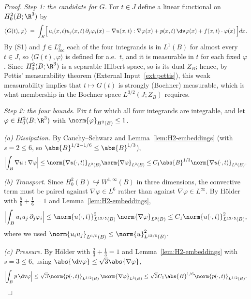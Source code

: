 \documentclass[11pt,reqno]{amsart}
\begin{document}
\begin{proof}
\emph{Step 1: the candidate for $G$.} For $t\in J$ define a linear functional on
$H^{2}_{0}(B;\R^{3})$ by
\begin{equation}\label{eq:G-def}
  \bigl\langle G(t),\varphi\bigr\rangle
  \;=\;\int_{B}\Bigl[\,u_{i}(x,t)u_{j}(x,t)\,\partial_{j}\varphi_{i}(x)
      -\nabla u(x,t):\nabla\varphi(x)
      +p(x,t)\,\dv\varphi(x)
      +f(x,t)\cdot\varphi(x)\,\Bigr]dx .
\end{equation}
By (S1) and $f\in L^{q}_{loc}$ each of the four integrands is in $L^{1}(B)$ for
almost every $t\in J$, so $\langle G(t),\varphi\rangle$ is defined for a.e.\
$t$, and it is measurable in $t$ for each fixed $\varphi$. Since
$H^{2}_{0}(B;\R^{3})$ is a separable Hilbert space, so is its dual $Z_{B}$;
hence, by Pettis' measurability theorem
(External Input~\ref{ext:pettis}), this weak measurability implies that
$t\mapsto G(t)$ is strongly (Bochner) measurable, which is what membership in
the Bochner space $L^{3/2}(J;Z_{B})$ requires.

\emph{Step 2: the four bounds.} Fix $t$ for which all four integrands are
integrable, and let $\varphi\in H^{2}_{0}(B;\R^{3})$ with
$\norm{\varphi}_{H^{2}(B)}\le1$.

\emph{(a) Dissipation.} By Cauchy--Schwarz and
Lemma~\ref{lem:H2-embeddings} (with $s=2\le6$, so
$\abs{B}^{1/2-1/6}\le\abs{B}^{1/3}$),
\[
  \Bigl|\int_{B}\nabla u:\nabla\varphi\Bigr|
  \le\norm{\nabla u(\cdot,t)}_{L^{2}(B)}\norm{\nabla\varphi}_{L^{2}(B)}
  \le C_{1}\abs{B}^{1/3}\norm{\nabla u(\cdot,t)}_{L^{2}(B)} .
\]

\emph{(b) Transport.} Since $H^{2}_{0}(B)\not\hookrightarrow W^{1,\infty}(B)$ in
three dimensions, the convective term must be paired against
$\nabla\varphi\in L^{6}$ rather than against $\nabla\varphi\in L^{\infty}$. By
H\"older with $\tfrac{5}{6}+\tfrac16=1$ and Lemma~\ref{lem:H2-embeddings},
\[
  \Bigl|\int_{B}u_{i}u_{j}\,\partial_{j}\varphi_{i}\Bigr|
  \le\norm{u(\cdot,t)}_{L^{12/5}(B)}^{2}\,
     \norm{\nabla\varphi}_{L^{6}(B)}
  \le C_{1}\norm{u(\cdot,t)}_{L^{12/5}(B)}^{2} ,
\]
where we used $\norm{u_{i}u_{j}}_{L^{6/5}(B)}\le\norm{u}_{L^{12/5}(B)}^{2}$.

\emph{(c) Pressure.} By H\"older with $\tfrac{2}{3}+\tfrac13=1$ and
Lemma~\ref{lem:H2-embeddings} with $s=3\le6$, using
$\abs{\dv\varphi}\le\sqrt{3}\abs{\nabla\varphi}$,
\[
  \Bigl|\int_{B}p\,\dv\varphi\Bigr|
  \le\sqrt{3}\norm{p(\cdot,t)}_{L^{3/2}(B)}\,\norm{\nabla\varphi}_{L^{3}(B)}
  \le\sqrt{3}C_{1}\abs{B}^{1/6}\norm{p(\cdot,t)}_{L^{3/2}(B)} .
\]


\end{proof}
\end{document}
